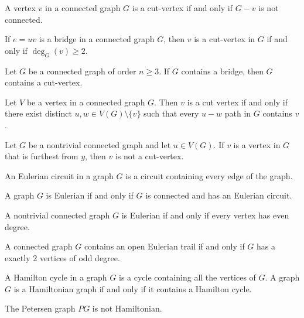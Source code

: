 \documentclass{article}
\begin{document}
\medskip{}

    A vertex $v$ in a connected graph $G$ is a cut-vertex if and only if $G - v$ is not connected.

\medskip{}

    If $e=uv$ is a bridge in a connected graph $G$, then $v$ is a cut-vertex in $G$ if and only if $\deg_G(v) \geq 2$.

\medskip{}

    Let $G$ be a connected graph of order $n \geq 3$.
    If $G$ contains a bridge, then $G$ contains a cut-vertex.

\medskip{}

    Let $V$ be a vertex in a connected graph $G$. Then $v$ is a cut vertex if and only if there exist distinct $u,w \in V(G) \setminus \{v\}$ such that every $u-w$ path in $G$ contains $v$.

\medskip{}

    Let $G$ be a nontrivial connected graph and let $u \in V(G)$. If $v$ is a vertex in $G$ that is furthest from $y$, then $v$ is not a cut-vertex.

\medskip{}

    An Eulerian circuit in a graph $G$ is a circuit containing every edge of the graph.

\medskip{}

    A graph $G$ is Eulerian if and only if $G$ is connected and has an Eulerian circuit.

\medskip{}

    A nontrivial connected graph $G$ is Eulerian if and only if every vertex has even degree.

\medskip{}

    A connected graph $G$ contains an open Eulerian trail if and only if $G$ has a exactly 2 vertices of odd degree.

\medskip{}

    A Hamilton cycle in a graph $G$ is a cycle containing all the vertices of $G$.
    A graph $G$ is a Hamiltonian graph if and only if it contains a Hamilton cycle.

\medskip{}

    The Petersen graph $PG$ is not Hamiltonian.

\medskip{}
\end{document}
